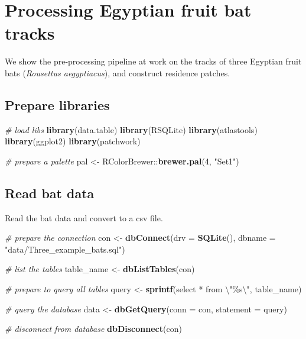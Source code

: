 \documentclass[
]{scrreprt}
\newenvironment{Shaded}{}{}
\newcommand{\CharTok}[1]{\textcolor[rgb]{0.25,0.44,0.63}{#1}}
\newcommand{\CommentTok}[1]{\textcolor[rgb]{0.38,0.63,0.69}{\textit{#1}}}
\newcommand{\DataTypeTok}[1]{\textcolor[rgb]{0.56,0.13,0.00}{#1}}
\newcommand{\DecValTok}[1]{\textcolor[rgb]{0.25,0.63,0.44}{#1}}
\newcommand{\KeywordTok}[1]{\textcolor[rgb]{0.00,0.44,0.13}{\textbf{#1}}}
\newcommand{\NormalTok}[1]{#1}
\newcommand{\OperatorTok}[1]{\textcolor[rgb]{0.40,0.40,0.40}{#1}}
\newcommand{\StringTok}[1]{\textcolor[rgb]{0.25,0.44,0.63}{#1}}
\begin{document}
\hypertarget{processing-egyptian-fruit-bat-tracks}{%
\chapter{Processing Egyptian fruit bat tracks}\label{processing-egyptian-fruit-bat-tracks}}

We show the pre-processing pipeline at work on the tracks of three Egyptian fruit bats (\emph{Rousettus aegyptiacus}), and construct residence patches.

\hypertarget{prepare-libraries}{%
\section{Prepare libraries}\label{prepare-libraries}}

\begin{Shaded}
\begin{Highlighting}[]
\CommentTok{\# load libs}
\KeywordTok{library}\NormalTok{(data.table)}
\KeywordTok{library}\NormalTok{(RSQLite)}
\KeywordTok{library}\NormalTok{(atlastools)}
\KeywordTok{library}\NormalTok{(ggplot2)}
\KeywordTok{library}\NormalTok{(patchwork)}

\CommentTok{\# prepare a palette}
\NormalTok{pal <{-}}\StringTok{ }\NormalTok{RColorBrewer}\OperatorTok{::}\KeywordTok{brewer.pal}\NormalTok{(}\DecValTok{4}\NormalTok{, }\StringTok{"Set1"}\NormalTok{)}
\end{Highlighting}
\end{Shaded}

\hypertarget{read-bat-data}{%
\section{Read bat data}\label{read-bat-data}}

Read the bat data and convert to a csv file.

\begin{Shaded}
\begin{Highlighting}[]
\CommentTok{\# prepare the connection}
\NormalTok{con <{-}}\StringTok{ }\KeywordTok{dbConnect}\NormalTok{(}\DataTypeTok{drv =} \KeywordTok{SQLite}\NormalTok{(), }\DataTypeTok{dbname =} \StringTok{"data/Three\_example\_bats.sql"}\NormalTok{)}

\CommentTok{\# list the tables}
\NormalTok{table\_name <{-}}\StringTok{ }\KeywordTok{dbListTables}\NormalTok{(con)}

\CommentTok{\# prepare to query all tables}
\NormalTok{query <{-}}\StringTok{ }\KeywordTok{sprintf}\NormalTok{(}\StringTok{\textquotesingle{}select * from }\CharTok{\textbackslash{}"}\StringTok{\%s}\CharTok{\textbackslash{}"}\StringTok{\textquotesingle{}}\NormalTok{, table\_name)}

\CommentTok{\# query the database}
\NormalTok{data <{-}}\StringTok{ }\KeywordTok{dbGetQuery}\NormalTok{(}\DataTypeTok{conn =}\NormalTok{ con, }\DataTypeTok{statement =}\NormalTok{ query)}

\CommentTok{\# disconnect from database}
\KeywordTok{dbDisconnect}\NormalTok{(con)}
\end{Highlighting}
\end{Shaded}
\end{document}
